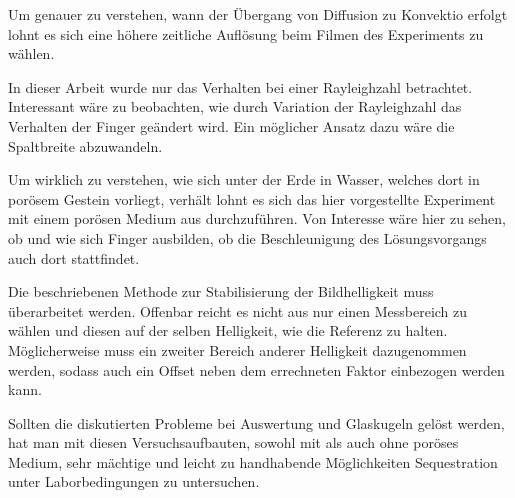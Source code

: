 Um genauer zu verstehen, wann der Übergang von Diffusion zu Konvektio erfolgt lohnt es sich eine höhere zeitliche Auflösung beim Filmen des Experiments zu wählen.

In dieser Arbeit wurde nur das Verhalten bei einer Rayleighzahl betrachtet. Interessant wäre zu beobachten, wie durch Variation der Rayleighzahl das Verhalten der Finger geändert wird. Ein möglicher Ansatz dazu wäre die Spaltbreite abzuwandeln.

Um wirklich zu verstehen, wie sich \COT unter der Erde in Wasser, welches dort in porösem Gestein vorliegt, verhält lohnt es sich das hier vorgestellte \COTm Experiment mit einem porösen Medium aus \BOG durchzuführen. Von Interesse wäre hier zu sehen, ob und wie sich Finger ausbilden, \dah ob die Beschleunigung des Lösungsvorgangs auch dort stattfindet.


Die beschriebenen Methode zur Stabilisierung der Bildhelligkeit muss überarbeitet werden. Offenbar reicht es nicht aus nur einen Messbereich zu wählen und diesen auf der selben Helligkeit, wie die Referenz zu halten. Möglicherweise muss ein zweiter Bereich anderer Helligkeit dazugenommen werden, sodass auch ein Offset neben dem errechneten Faktor einbezogen werden kann.


Sollten die diskutierten Probleme bei Auswertung und Glaskugeln gelöst werden, hat man mit diesen Versuchsaufbauten, sowohl mit als auch ohne poröses Medium, sehr mächtige und leicht zu handhabende Möglichkeiten \COTm Sequestration unter Laborbedingungen zu untersuchen.